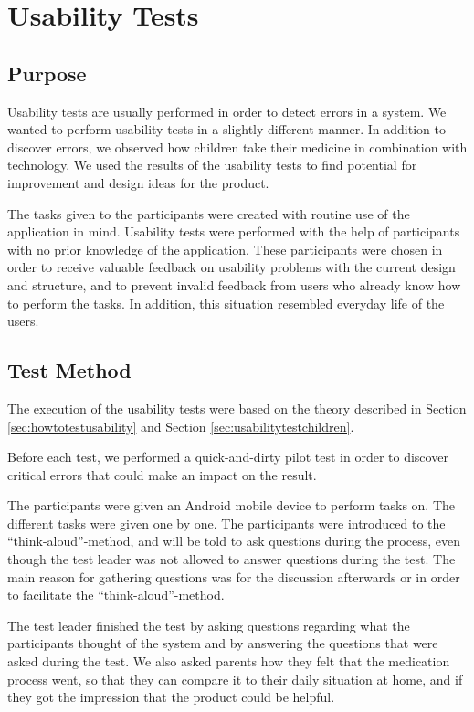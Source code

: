 \chapter{Usability Tests}
\label{chp:usabilitytests}


\section{Purpose}
\label{sec:usabilitypurpose}
Usability tests are usually performed in order to detect errors in a system. We wanted to perform usability tests in a slightly different manner. In addition to discover errors, we observed how children take their medicine in combination with technology. We used the results of the usability tests to find potential for improvement and design ideas for  the product.
 
The tasks given to the participants were created with routine use of the application in mind. Usability tests were performed with the help of participants with no prior knowledge of the application. These participants were chosen in order to receive valuable feedback on usability problems with the current design and structure, and to prevent invalid feedback from users who already know how to perform the tasks. In addition, this situation resembled everyday life of the users.


\section{Test Method}
The execution of the usability tests were based on the theory described in Section \ref{sec:howtotestusability} and Section \ref{sec:usabilitytestchildren}.

Before each test, we performed a quick-and-dirty pilot test in order to discover critical errors that could make an impact on the result.

The participants were given an Android mobile device to perform tasks on. The different tasks were given one by one. The participants were introduced to the ``think-aloud''-method, and will be told to ask questions during the process, even though the test leader was not allowed to answer questions during the test. The main reason for gathering questions was for the discussion afterwards or in order to facilitate the ``think-aloud''-method. 

The test leader finished the test by asking questions regarding what the participants thought of the system and by answering the questions that were asked during the test. We also asked parents how they felt that the medication process went, so that they can compare it to their daily situation at home, and if they got the impression that the product could be helpful.  

